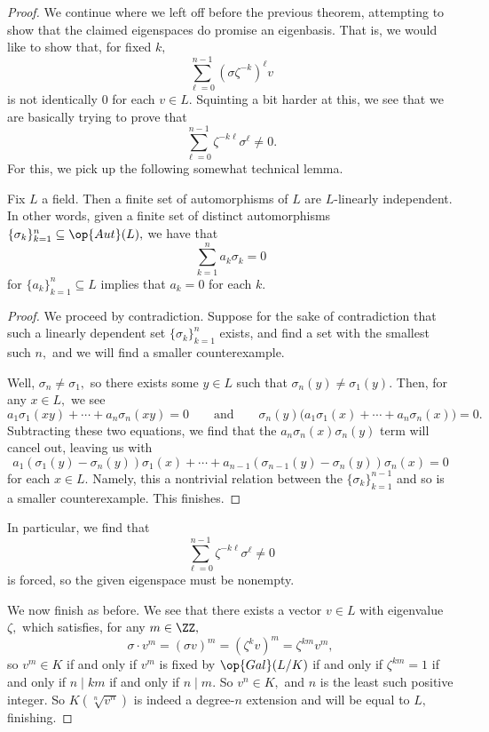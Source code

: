 \begin{proof}
	We continue where we left off before the previous theorem, attempting to show that the claimed eigenspaces do promise an eigenbasis. That is, we would like to show that, for fixed $k,$
	\[\sum_{\ell=0}^{n-1}\left(\sigma\zeta^{-k}\right)^\ell v\]
	is not identically $0$ for each $v\in L.$ Squinting a bit harder at this, we see that we are basically trying to prove that
	\[\sum_{\ell=0}^{n-1}\zeta^{-k\ell}\sigma^\ell\ne0.\]
	For this, we pick up the following somewhat technical lemma.
	\begin{lemma} \label{lem:linindauto}
		Fix $L$ a field. Then a finite set of automorphisms of $L$ are $L$-linearly independent. In other words, given a finite set of distinct automorphisms $\{\sigma_k\}_{k=1}^n\subseteq\op{Aut}(L),$ we have that
		\[\sum_{k=1}^na_k\sigma_k=0\]
		for $\{a_k\}_{k=1}^n\subseteq L$ implies that $a_k=0$ for each $k.$
	\end{lemma}
	\begin{proof}
		We proceed by contradiction. Suppose for the sake of contradiction that such a linearly dependent set $\{\sigma_k\}_{k=1}^n$ exists, and find a set with the smallest such $n,$ and we will find a smaller counterexample.
		
		Well, $\sigma_n\ne\sigma_1,$ so there exists some $y\in L$ such that $\sigma_n(y)\ne\sigma_1(y).$ Then, for any $x\in L,$ we see
		\[a_1\sigma_1(xy)+\cdots+a_n\sigma_n(xy)=0\qquad\text{and}\qquad\sigma_n(y)\big(a_1\sigma_1(x)+\cdots+a_n\sigma_n(x)\big)=0.\]
		Subtracting these two equations, we find that the $a_n\sigma_n(x)\sigma_n(y)$ term will cancel out, leaving us with
		\[a_1(\sigma_1(y)-\sigma_n(y))\sigma_1(x)+\cdots+a_{n-1}(\sigma_{n-1}(y)-\sigma_n(y))\sigma_n(x)=0\]
		for each $x\in L.$ Namely, this a nontrivial relation between the $\{\sigma_k\}_{k=1}^{n-1}$ and so is a smaller counterexample. This finishes.
	\end{proof}
	In particular, we find that
	\[\sum_{\ell=0}^{n-1}\zeta^{-k\ell}\sigma^\ell\ne0\]
	is forced, so the given eigenspace must be nonempty.

	We now finish as before. We see that there exists a vector $v\in L$ with eigenvalue $\zeta,$ which satisfies, for any $m\in\ZZ,$
	\[\sigma\cdot v^m=(\sigma v)^m=(\zeta^k v)^m=\zeta^{km}v^m,\]
	so $v^m\in K$ if and only if $v^m$ is fixed by $\op{Gal}(L/K)$ if and only if $\zeta^{km}=1$ if and only if $n\mid km$ if and only if $n\mid m.$ So $v^n\in K,$ and $n$ is the least such positive integer. So $K(\sqrt[n]{v^n})$ is indeed a degree-$n$ extension and will be equal to $L,$ finishing.
\end{proof}
